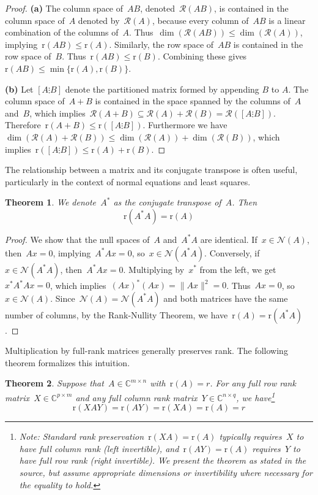\documentclass[12pt]{article}
\newtheorem{theorem}{Theorem}[section]
\newcommand{\rank}{\mathrm{r}}
\newcommand{\C}{\mathbb{C}}
\begin{document}
\begin{proof}
\textbf{(a)} The column space of~$AB$, denoted~$\mathcal{R}(AB)$, is contained in the column space of~$A$ denoted by~$\mathcal{R}(A)$, because every column of~$AB$ is a linear combination of the columns of~$A$. Thus~$\dim(\mathcal{R}(AB)) \le \dim(\mathcal{R}(A))$, implying~$\rank(AB) \le \rank(A)$.
Similarly, the row space of~$AB$ is contained in the row space of~$B$. Thus~$\rank(AB) \le \rank(B)$. Combining these gives~$\rank(AB) \le \min \{\rank(A), \rank(B)\}$.

\textbf{(b)} Let $[A \vdots B]$ denote the partitioned matrix formed by appending $B$ to $A$. The column space of~$A+B$ is contained in the space spanned by the columns of~$A$ and~$B$, which implies~$\mathcal{R}(A+B) \subseteq \mathcal{R}(A) + \mathcal{R}(B) = \mathcal{R}([A \vdots B])$.
Therefore~$\rank(A+B) \le \rank([A \vdots B])$.
Furthermore we have~$\dim(\mathcal{R}(A) + \mathcal{R}(B)) \le \dim(\mathcal{R}(A)) + \dim(\mathcal{R}(B))$, which implies~$\rank([A \vdots B]) \le \rank(A) + \rank(B)$.
\end{proof}

The relationship between a matrix and its conjugate transpose is often useful, particularly in the context of normal equations and least squares.

\begin{theorem}
We denote~$A^*$ as the conjugate transpose of~$A$. Then
\[
\rank(A^*A) = \rank(A)
\]
\end{theorem}

\begin{proof}
We show that the null spaces of~$A$ and~$A^*A$ are identical. If~$x \in \mathcal{N}(A)$, then~$Ax = 0$, implying~$A^*Ax = 0$, so~$x \in \mathcal{N}(A^*A)$.
Conversely, if~$x \in \mathcal{N}(A^*A)$, then~$A^*Ax = 0$. Multiplying by~$x^*$ from the left, we get~$x^*A^*Ax = 0$, which implies~$(Ax)^* (Ax) = \|Ax\|^2 = 0$. Thus~$Ax = 0$, so~$x \in \mathcal{N}(A)$.
Since~$\mathcal{N}(A) = \mathcal{N}(A^*A)$ and both matrices have the same number of columns, by the Rank-Nullity Theorem, we have~$\rank(A) = \rank(A^*A)$.
\end{proof}

Multiplication by full-rank matrices generally preserves rank. The following theorem formalizes this intuition.

\begin{theorem}
Suppose that~$A \in \C^{m \times n}$ with~$\rank(A) = r$. For any full row rank matrix~$X \in \C^{p \times m}$ and any full column rank matrix~$Y \in \C^{n \times q}$, we have\footnote{Note: Standard rank preservation~$\rank(XA)=\rank(A)$ typically requires~$X$ to have full \textit{column} rank (left invertible), and~$\rank(AY)=\rank(A)$ requires~$Y$ to have full \textit{row} rank (right invertible). We present the theorem as stated in the source, but assume appropriate dimensions or invertibility where necessary for the equality to hold.}
\[
\rank(XAY) = \rank(AY) = \rank(XA) = \rank(A) = r
\]
\end{theorem}
\end{document}
